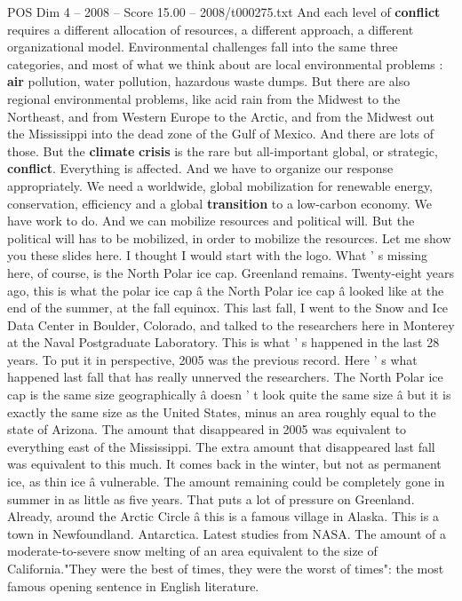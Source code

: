 \begin{textsample}{POS Dim 4 – 2008 – Score 15.00 – 2008/t000275.txt}
And each level of \textbf{conflict} requires a different allocation of resources, a different approach, a different organizational model.
Environmental challenges fall into the same three categories, and most of what we think about are local environmental problems : \textbf{air} pollution, water pollution, hazardous waste dumps.
But there are also regional environmental problems, like acid rain from the Midwest to the Northeast, and from Western Europe to the Arctic, and from the Midwest out the Mississippi into the dead zone of the Gulf of Mexico.
And there are lots of those.
But the \textbf{climate} \textbf{crisis} is the rare but all-important global, or strategic, \textbf{conflict}.
Everything is affected.
And we have to organize our response appropriately.
We need a worldwide, global mobilization for renewable energy, conservation, efficiency and a global \textbf{transition} to a low-carbon economy.
We have work to do.
And we can mobilize resources and political will.
But the political will has to be mobilized, in order to mobilize the resources.
Let me show you these slides here.
I thought I would start with the logo.
What ' s missing here, of course, is the North Polar ice cap.
Greenland remains.
Twenty-eight years ago, this is what the polar ice cap â the North Polar ice cap â looked like at the end of the summer, at the fall equinox.
This last fall, I went to the Snow and Ice Data Center in Boulder, Colorado, and talked to the researchers here in Monterey at the Naval Postgraduate Laboratory.
This is what ' s happened in the last 28 years.
To put it in perspective, 2005 was the previous record.
Here ' s what happened last fall that has really unnerved the researchers.
The North Polar ice cap is the same size geographically â doesn ' t look quite the same size â but it is exactly the same size as the United States, minus an area roughly equal to the state of Arizona.
The amount that disappeared in 2005 was equivalent to everything east of the Mississippi.
The extra amount that disappeared last fall was equivalent to this much.
It comes back in the winter, but not as permanent ice, as thin ice â vulnerable.
The amount remaining could be completely gone in summer in as little as five years.
That puts a lot of pressure on Greenland.
Already, around the Arctic Circle â this is a famous village in Alaska.
This is a town in Newfoundland.
Antarctica.
Latest studies from NASA.
The amount of a moderate-to-severe snow melting of an area equivalent to the size of California."They were the best of times, they were the worst of times": the most famous opening sentence in English literature.

\end{textsample}
